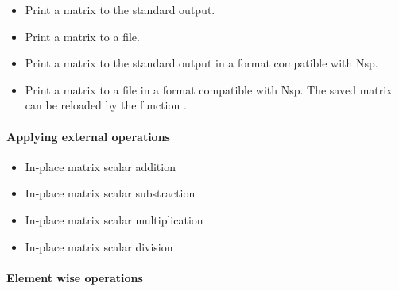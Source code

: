 \begin{itemize}
\item {}
  \sshortdescribe Print a matrix to the standard output.  

\item {}
  \sshortdescribe Print a matrix to a file.

\item {}
  \sshortdescribe Print a matrix to the standard output in a format
  compatible with Nsp.  

\item {}
  \sshortdescribe Print a matrix to a file in a format compatible with Nsp. The
  saved matrix can be reloaded by the function
  .
\end{itemize}

\paragraph{Applying external operations}
\begin{itemize}
  \item {}
  \sshortdescribe In-place matrix scalar addition  

\item {}
  \sshortdescribe In-place matrix scalar substraction  

\item {}
  \sshortdescribe In-place matrix scalar multiplication  

\item {}
  \sshortdescribe In-place matrix scalar division  

\end{itemize}

\paragraph{Element wise operations}

